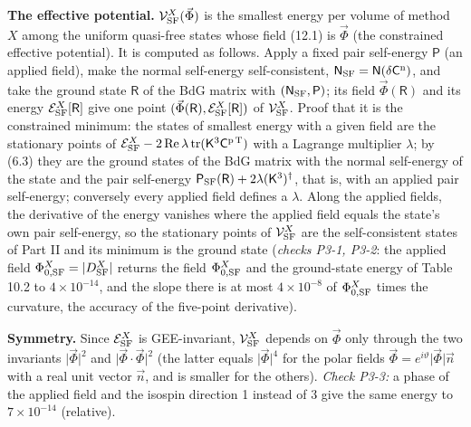 \documentclass[
  10pt,
]{article}
\begin{document}
\textbf{The effective potential.} \(\mathcal V^X_{\rm SF}(\vec\Phi)\) is
the smallest energy per volume of method \(X\) among the uniform
quasi-free states whose field (12.1) is \(\vec\Phi\) (the constrained
effective potential). It is computed as follows. Apply a fixed pair
self-energy \(\mathsf P\) (an applied field), make the normal
self-energy self-consistent,
\(\mathsf N_{\rm SF}=\mathsf N(\delta\mathsf C^{\rm n})\), and take the
ground state \(\mathsf R\) of the BdG matrix with
\((\mathsf N_{\rm SF},\mathsf P)\); its field \(\vec\Phi(\mathsf R)\)
and its energy \(\mathcal E^X_{\rm SF}[\mathsf R]\) give one point
\((\vec\Phi(\mathsf R),\mathcal E^X_{\rm SF}[\mathsf R])\) of
\(\mathcal V^X_{\rm SF}\). Proof that it is the constrained minimum: the
states of smallest energy with a given field are the stationary points
of
\(\mathcal E^X_{\rm SF}-2\,\mathrm{Re}\,\lambda\,\mathrm{tr}(\mathsf K^3\mathsf C^{\rm p\,T})\)
with a Lagrange multiplier \(\lambda\); by (6.3) they are the ground
states of the BdG matrix with the normal self-energy of the state and
the pair self-energy
\(\mathsf P_{\rm SF}(\mathsf R)+2\lambda(\mathsf K^3)^\dagger\), that
is, with an applied pair self-energy; conversely every applied field
defines a \(\lambda\). Along the applied fields, the derivative of the
energy vanishes where the applied field equals the state's own pair
self-energy, so the stationary points of \(\mathcal V^X_{\rm SF}\) are
the self-consistent states of Part II and its minimum is the ground
state (\emph{checks P3-1, P3-2}: the applied field
\(\Phi^X_{0,{\rm SF}}=\lvert D^X_{\rm SF}\rvert\) returns the field
\(\Phi^X_{0,{\rm SF}}\) and the ground-state energy of Table 10.2 to
\(4\times10^{-14}\), and the slope there is at most \(4\times10^{-8}\)
of \(\Phi^X_{0,{\rm SF}}\) times the curvature, the accuracy of the
five-point derivative).

\textbf{Symmetry.} Since \(\mathcal E^X_{\rm SF}\) is GEE-invariant,
\(\mathcal V^X_{\rm SF}\) depends on \(\vec\Phi\) only through the two
invariants \(\lvert\vec\Phi\rvert^2\) and
\(\lvert\vec\Phi\cdot\vec\Phi\rvert^2\) (the latter equals
\(\lvert\vec\Phi\rvert^4\) for the polar fields
\(\vec\Phi=e^{i\vartheta}\lvert\vec\Phi\rvert\vec n\) with a real unit
vector \(\vec n\), and is smaller for the others). \emph{Check P3-3:} a
phase of the applied field and the isospin direction 1 instead of 3 give
the same energy to \(7\times10^{-14}\) (relative).
\end{document}
